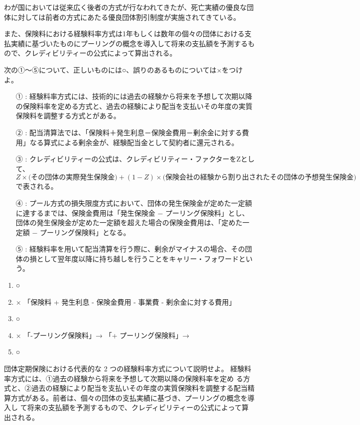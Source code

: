 \documentclass[report,gutter=10mm,fore-edge=10mm,uplatex,dvipdfmx]{jlreq}
\begin{document}
わが国においては従来広く後者の方式が行なわれてきたが、死亡実績の優良な団体に対しては前者の方式にあたる優良団体割引制度が実施されてきている。

また、保険料における経験料率方式は1年もしくは数年の個々の団体における支払実績に基づいたものにプーリングの概念を導入して将来の支払額を予測するもので、クレディビリティーの公式によって算出される。

次の①～⑤について、正しいものには○、誤りのあるものについては×をつけよ。

\begin{itemize}
\item[ ① : ] 経験料率方式には、技術的には過去の経験から将来を予想して次期以降の保険料率を定める方式と、過去の経験により配当を支払いその年度の実質保険料を調整する方式とがある。
\item[ ② : ] 配当清算法では、「保険料＋発生利息－保険金費用－剰余金に対する費用」なる算式による剰余金が、経験配当金として契約者に還元される。
\item[ ③ : ] クレディビリティーの公式は、クレディビリティー・ファクターをZとして、
$$Z \times \text{(その団体の実際発生保険金)} +(1 - Z) \times \text{(保険会社の経験から割り出されたその団体の予想発生保険金)}
$$
で表される。
\item[ ④ : ] プール方式の損失限度方式において、団体の発生保険金が定めた一定額に達するまでは、保険金費用は「発生保険金 − プーリング保険料」とし、団体の発生保険金が定めた一定額を超えた場合の保険金費用は、「定めた一定額 − プーリング保険料」となる。
\item[ ⑤ : ] 経験料率を用いて配当清算を行う際に、剰余がマイナスの場合、その団体の損として翌年度以降に持ち越しを行うことをキャリー・フォワードという。
\end{itemize}

\answer{}
\begin{enumerate}
 \item ○
 \item ×  「保険料 + 発生利息 - 保険金費用 - 事業費 - 剰余金に対する費用」
 \item ○ 
 \item × 「-プーリング保険料」→ 「+ プーリング保険料」→
\item ○
\end{enumerate}
団体定期保険における代表的な 2 つの経験料率方式について説明せよ。
\answer{}
経験料率方式には、①過去の経験から将来を予想して次期以降の保険料率を定め
る方式と、②過去の経験により配当を支払いその年度の実質保険料を調整する配当精
算方式がある。前者は、個々の団体の支払実績に基づき、プーリングの概念を導入し
て将来の支払額を予測するもので、クレディビリティーの公式によって算出される。
\end{document}
